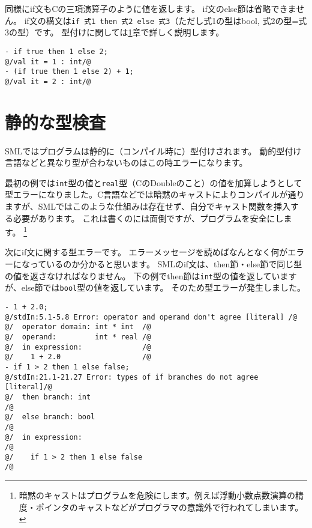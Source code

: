 \documentclass[11pt,a4paper]{article}
\begin{document}
同様にif文もCの三項演算子のように値を返します。
if文のelse節は省略できません。
if文の構文は\lstinline{if 式1 then 式2 else 式3}（ただし式1の型はbool, 式2の型=式3の型）です。
型付けに関しては\ref{sec:static-typing}章で詳しく説明します。

\begin{lstlisting}[caption=if文は値,label=doce:if-statement]
- if true then 1 else 2;
@/val it = 1 : int/@
- (if true then 1 else 2) + 1;
@/val it = 2 : int/@
\end{lstlisting}



\section{静的な型検査}
\label{sec:static-typing}

SMLではプログラムは静的に（コンパイル時に）型付けされます。
動的型付け言語などと異なり型が合わないものはこの時エラーになります。

最初の例では\lstinline{int}型の値と\lstinline{real}型（CのDoubleのこと）の値を加算しようとして型エラーになりました。C言語などでは暗黙のキャストによりコンパイルが通りますが、SMLではこのような仕組みは存在せず、自分でキャスト関数を挿入する必要があります。
これは書くのには面倒ですが、プログラムを安全にします。
\footnote{暗黙のキャストはプログラムを危険にします。例えば浮動小数点数演算の精度・ポインタのキャストなどがプログラマの意識外で行われてしまいます。}

次にif文に関する型エラーです。
エラーメッセージを読めばなんとなく何がエラーになっているのか分かると思います。
SMLのif文は、then節・else節で同じ型の値を返さなければなりません。
下の例でthen節は\lstinline{int}型の値を返していますが、else節では\lstinline{bool}型の値を返しています。
そのため型エラーが発生しました。

\begin{lstlisting}[label=code:type-error1,caption=型エラー１]
- 1 + 2.0;
@/stdIn:5.1-5.8 Error: operator and operand don't agree [literal] /@
@/  operator domain: int * int  /@
@/  operand:         int * real /@
@/  in expression:              /@
@/    1 + 2.0                   /@
- if 1 > 2 then 1 else false;
@/stdIn:21.1-21.27 Error: types of if branches do not agree [literal]/@
@/  then branch: int                                                 /@
@/  else branch: bool                                                /@
@/  in expression:                                                   /@
@/    if 1 > 2 then 1 else false                                     /@
\end{lstlisting}
\end{document}
